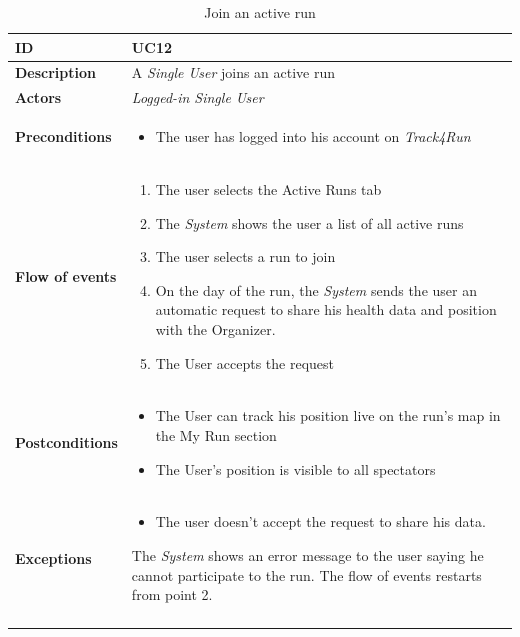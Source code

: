 \documentclass[titlepage]{article}
\begin{document}
 \begin{longtable}{| p{3 cm} | p{10 cm} |} 
			\hline
			{\bf ID} & UC12 \\
			\hline
			{\bf Description} & A {\it Single User} joins an active run  \\
			\hline
			{\bf Actors} & {\it Logged-in {\it Single User} }\\
			\hline
			{\bf Preconditions} & 		
							\begin{itemize}
								\item The user has logged into his account on {\it Track4Run}
							\end{itemize}
			\\
			\hline
			{\bf Flow of events} & 
							\begin{enumerate}
								\item The user selects the Active Runs tab
\item The {\it System} shows the user a list of all active runs 
\item The user selects a run to join
\item On the day of the run, the {\it System} sends the user an automatic request to share his health data and position with the Organizer.
\item The User accepts the request
							\end{enumerate}			
			 \\
			\hline
			{\bf Postconditions} & 
							\begin{itemize}
								\item The User can track his position live on the run’s map in the My Run section
\item The User’s position is visible to all spectators 
							\end{itemize}
			\\
			\hline
			{\bf Exceptions} & 
							\begin{itemize}
								\item The user doesn’t accept the request to share his data.
							\end{itemize}
							The {\it System} shows an error message to the user saying he cannot participate to the run. The flow of events restarts from point 2.						
			\\
			\hline
			\caption{Join an active run}
			\end{longtable}
\end{document}
